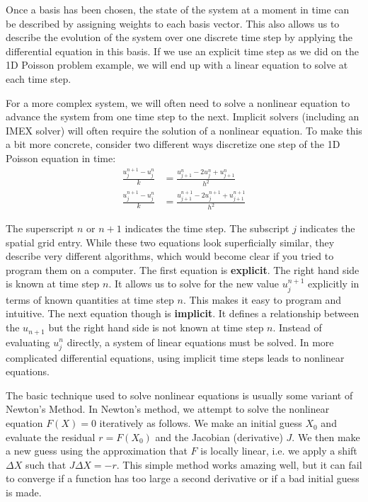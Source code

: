 \documentclass[11pt]{article} %
\begin{document}
Once a basis has been chosen, the state of the system at a moment in time
can be described by assigning weights to each basis vector.  
This also allows us to describe the evolution of the system over one discrete
time step by applying the differential equation in this basis.
If we use an explicit time step as we did on the 1D Poisson problem
example, we will end up with a linear equation to solve at each time step.

For a more complex system, we will often need to solve a nonlinear equation
to advance the system from one time step to the next.
Implicit solvers (including an IMEX solver) will often require the solution of a nonlinear equation.
To make this a bit more concrete, consider two different ways discretize one
step of the 1D Poisson equation in time:
\begin{align}
\frac{u^{n+1}_{j} - u^{n}_{j}}{k} &= \frac{u^{n}_{j+1} - 2u^{n}_{j} + u^{n}_{j+1} }{h^2} \\
\frac{u^{n+1}_{j} - u^{n}_{j}}{k} &= \frac{u^{n+1}_{j+1} - 2u^{n+1}_{j} + u^{n+1}_{j+1} }{h^2}
\end{align}

The superscript $n$ or $n+1$ indicates the time step.  
The subscript $j$ indicates the spatial grid entry.
While these two equations look superficially similar, they describe very different algorithms, 
which would become clear if you tried to program them on a computer.
The first equation is \textbf{explicit}.  The right hand side is known at time step $n$.
It allows us to solve for the new value $u^{n+1}_{j}$ explicitly in terms of known quantities at time step $n$.
This makes it easy to program and intuitive.
The next equation though is \textbf{implicit}.  
It defines a relationship between the $u_{n+1}$ but the right hand side is not known at time step $n$.
Instead of evaluating $u^{n}_{j}$ directly, a system of linear equations must be solved.
In more complicated differential equations, using implicit time steps leads to nonlinear equations.

The basic technique used to solve nonlinear equations is usually some variant of Newton's Method.
In Newton's method, we attempt to solve the nonlinear equation $F(X) = 0$ iteratively as follows.
We make an initial guess $X_0$ and evaluate the residual $r = F(X_0)$ and the Jacobian (derivative) $J$.
We then make a new guess using the approximation that $F$ is locally linear,
i.e. we apply a shift $\Delta X$ such that $J \Delta X = -r$.
This simple method works amazing well, but it can fail to converge if a function
has too large a second derivative or if a bad initial guess is made.
\end{document}

